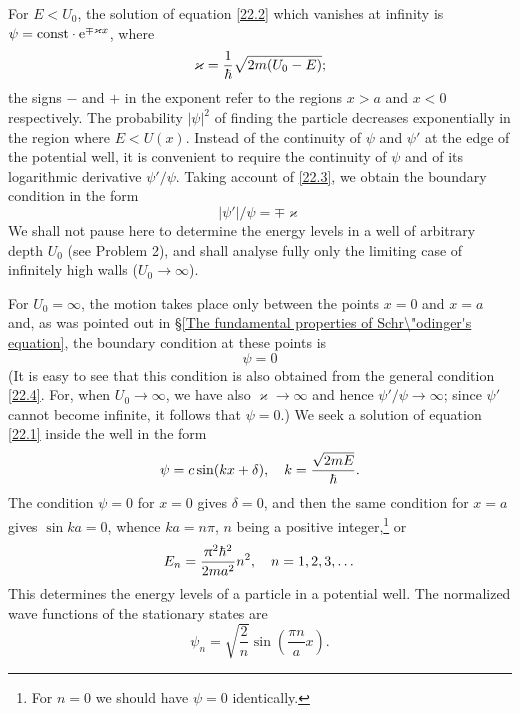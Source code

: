 For $ E < U_0 $, the solution of equation \eqref{22.2} which vanishes at infinity is $ \psi=\mathrm{const}\cdot\mathrm{e}^{\mp\varkappa x} $, where
\begin{equation}\label{22.3}
\varkappa=\frac{1}{\hbar}\sqrt{2m(U_0-E)};
\end{equation}
the signs $ - $ and $ + $ in the exponent refer to the regions $ x > a $ and $ x < 0 $ respectively. The probability $ |\psi|^2 $ of finding the particle decreases exponentially in the region where $ E < U (x) $. Instead of the continuity of $\psi$ and $\psi'$ at the edge of the potential well, it is convenient to require the continuity of $\psi$ and of its logarithmic derivative $\psi'/\psi$. Taking account of \eqref{22.3}, we obtain the boundary condition in the form
\begin{equation}\label{22.4}
|\psi'|/\psi=\mp\varkappa
\end{equation}
We shall not pause here to determine the energy levels in a well of arbitrary depth $ U_0 $ (see Problem 2), and shall analyse fully only the limiting case of infinitely high walls ($ U_0\to\infty $).

For $ U_0 = \infty $, the motion takes place only between the points $ x = 0 $ and $ x = a $ and, as was pointed out in \S\ref{The fundamental properties of Schr\"odinger's equation}, the boundary condition at these points is
\begin{equation}\label{22.5}
\psi=0
\end{equation}
(It is easy to see that this condition is also obtained from the general condition \eqref{22.4}. For, when $ U_0\to\infty $, we have also $ \varkappa\to\infty $ and hence $ \psi'/\psi\to\infty $; since $\psi'$ cannot become infinite, it follows that $ \psi= 0 $.) We seek a solution of equation \eqref{22.1} inside the well in the form
\begin{equation}\label{22.6}
\psi=c\sin(kx+\delta),\quad k=\frac{\sqrt{2mE}}{\hbar}.
\end{equation}
The condition $ \psi = 0 $ for $ x = 0 $ gives $ \delta = 0 $, and then the same condition for $ x = a $ gives $ \sin ka = 0 $, whence $ ka = n\pi $, $ n $ being a positive integer,\footnote{For $ n = 0 $ we should have $ \psi = 0 $ identically.} or
\begin{equation}\label{22.7}
E_n=\frac{\uppi^2\hbar^2}{2ma^2}n^2,\quad n=1,2,3,\dots
\end{equation}
This determines the energy levels of a particle in a potential well. The normalized wave functions of the stationary states are
\begin{equation}\label{22.8}
\psi_n=\sqrt{\frac{2}{n}}\sin\left( \frac{\pi n}{a}x\right). 
\end{equation}


